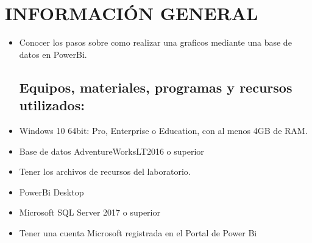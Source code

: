 \section{INFORMACIÓN GENERAL} 

\begin{itemize}
\subsection{Objetivos:}
	\item Conocer los pasos sobre como realizar una graficos mediante una base de datos en PowerBi.
\subsection{Equipos, materiales, programas y recursos utilizados:}
	\item Windows 10 64bit: Pro, Enterprise o Education, con al menos 4GB de RAM.
	\item Base de datos AdventureWorksLT2016 o superior
	\item Tener los archivos de recursos del laboratorio.
	\item PowerBi Desktop
	\item Microsoft SQL Server 2017 o superior
	\item Tener una cuenta Microsoft registrada en el Portal de Power Bi

\end{itemize}
